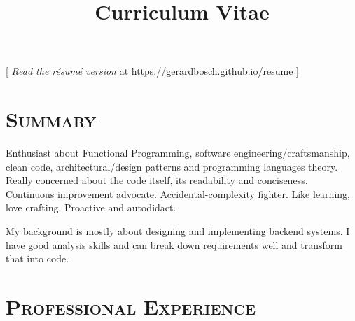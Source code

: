 \documentclass[10pt,a4paper,colorlinks=true]{moderncv}
\title{Curriculum Vitae}               %
\begin{document}
\maketitle

\setlength{\parskip}{4pt}


[ \emph{Read the résumé version} at \href{https://gerardbosch.github.io/resume}{https://gerardbosch.github.io/resume} ] \\[2pt]


\section{\textsc{Summary}}
\vspace{1em}
\begin{adjustwidth}{1cm}{1cm}

Enthusiast about Functional Programming, software engineering/craftsmanship, clean code, architectural/design patterns and programming languages theory. Really concerned about the code itself, its readability and conciseness. Continuous improvement advocate. Accidental-complexity fighter. Like learning, love crafting. Proactive and autodidact.

My background is mostly about designing and implementing backend systems. I have good analysis skills and can break down requirements well and transform that into code.
\end{adjustwidth}

\vspace{1em}
\section{\textsc{Professional Experience}}

\end{document}
